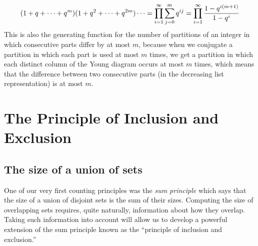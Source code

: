 \documentclass[10pt,]{book}
\theoremstyle{plain}
\theoremstyle{definition}
\theoremstyle{definition}
\numberwithin{equation}{chapter}
\begin{document}
\begin{exerciselist}
%
\begin{equation*}
(1+q+\cdots+q^m)(1+q^2 +\cdots+q^{2m})\cdots
=\prod_{i=1}^\infty\sum_{j=0}^m q^{ij}\\
=\prod_{i=1}^\infty \frac{1-q^{i(m+1)}}{1-q^i}
\end{equation*}
This is also the generating function for the number of partitions of an integer in which consecutive parts differ by at most \(m\), because when we conjugate a partition in which each part is used at most \(m\) times, we get a partition in which each distinct column of the Young diagram occurs at most \(m\) times, which means that the difference between two consecutive parts (in the decreasing list representation) is at most \(m\).%
\end{exerciselist}
\typeout{************************************************}
\typeout{************************************************}
\chapter[{The Principle of Inclusion and Exclusion}]{The Principle of Inclusion and Exclusion}\label{ch_inclexcl}
\typeout{************************************************}
\typeout{************************************************}
\section[{The size of a union of sets}]{The size of a union of sets}\label{sec_inclexcl-sizeunion}
One of our very first counting principles was the \emph{sum principle} which says that the size of a union of disjoint sets is the sum of their sizes. Computing the size of overlapping sets requires, quite naturally, information about how they overlap. Taking such information into account will allow us to develop a powerful extension of the sum principle known as the ``principle of inclusion and exclusion.''%
\typeout{************************************************}
\typeout{************************************************}
\end{document}
